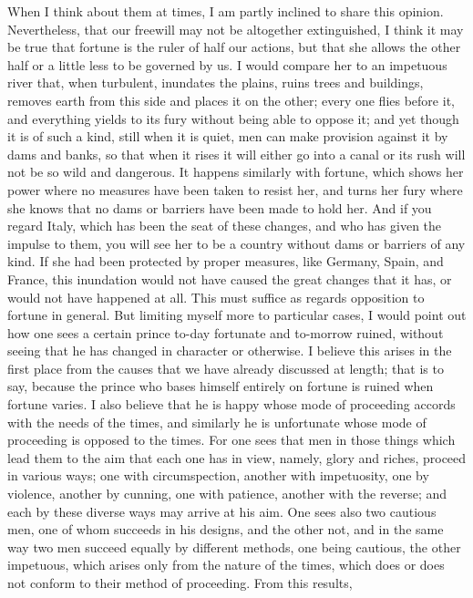\documentclass[12pt,letterpaper]{memoir}
\begin{document}
When I think about them at times, I am partly inclined to share
this opinion. Nevertheless, that our freewill may not be altogether
extinguished, I think it may be true that fortune is the ruler of half
our actions, but that she allows the other half or a little less to be
governed by us. I would compare her to an impetuous river that, when
turbulent, inundates the plains, ruins trees and buildings, removes
earth from this side and places it on the other; every one flies before
it, and everything yields to its fury without being able to oppose it;
and yet though it is of such a kind, still when it is quiet, men can
make provision against it by dams and banks, so that when it rises
it will either go into a canal or its rush will not be so wild and
dangerous. It happens similarly with fortune, which shows her power
where no measures have been taken to resist her, and turns her fury
where she knows that no dams or barriers have been made to hold her.
And if you regard Italy, which has been the seat of these changes, and
who has given the impulse to them, you will see her to be a country
without dams or barriers of any kind. If she had been protected by
proper measures, like Germany, Spain, and France, this inundation
would not have caused the great changes that it has, or would not have
happened at all. This must suffice as regards opposition to fortune
in general. But limiting myself more to particular cases, I would
point out how one sees a certain prince to-day fortunate and to-morrow
ruined, without seeing that he has changed in character or otherwise.
I believe this arises in the first place from the causes that we have
already discussed at length; that is to say, because the prince who
bases himself entirely on fortune is ruined when fortune varies. I
also believe that he is happy whose mode of proceeding accords with
the needs of the times, and similarly he is unfortunate whose mode of
proceeding is opposed to the times. For one sees that men in those
things which lead them to the aim that each one has in view, namely,
glory and riches, proceed in various ways; one with circumspection,
another with impetuosity, one by violence, another by cunning, one with
patience, another with the reverse; and each by these diverse ways
may arrive at his aim. One sees also two cautious men, one of whom
succeeds in his designs, and the other not, and in the same way two men
succeed equally by different methods, one being cautious, the other
impetuous, which arises only from the nature of the times, which does
or does not conform to their method of proceeding. From this results,
\end{document}
